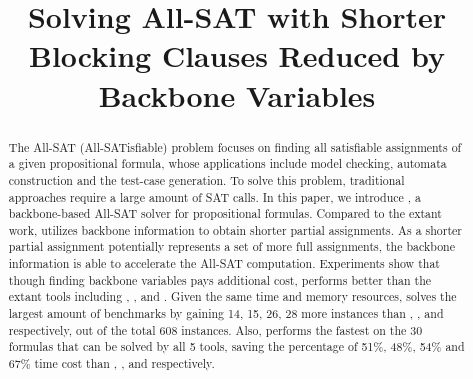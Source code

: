\documentclass{article}
\begin{document}
\title{Solving All-SAT with Shorter Blocking Clauses Reduced by Backbone Variables}
\maketitle
\begin{abstract}
The All-SAT (All-SATisfiable) problem focuses on finding all satisfiable assignments of a given propositional formula, whose applications include model checking, automata construction and the test-case generation. To solve this problem, traditional approaches require a large amount of SAT calls.
In this paper, we introduce \tool, a backbone-based All-SAT solver for propositional formulas. Compared to the extant work, \tool utilizes backbone information to obtain shorter partial assignments. As a shorter partial assignment potentially represents a set of more full assignments, the backbone information is able to accelerate the All-SAT computation. 
Experiments show that though finding backbone variables pays additional cost, \tool performs better than the extant tools including \ctool, \bc, \nbc and \bdd.
Given the same time and memory resources, \tool solves the largest amount of benchmarks by gaining 14, 15, 26, 28 more instances than \ctool, \bc, \nbc and \bdd respectively, out of the total 608 instances.
Also, \tool performs the fastest on the 30 formulas that can be solved by all 5 tools, saving the percentage of 51\%, 48\%, 54\% and 67\% time cost than \ctool, \bc, \nbc and \bdd respectively.
\end{abstract}








\end{document}
